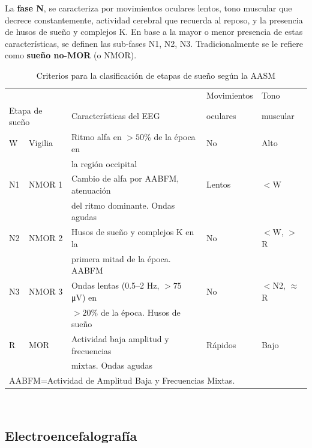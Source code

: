 \documentclass[12pt,letterpaper,draft]{book}
\newcommand{\hz}{\si{\hertz}\xspace}
\newcommand{\mv}{\si{\micro\volt}\xspace}
\begin{document}
%
La \textbf{fase N}, se caracteriza por movimientos oculares lentos, tono muscular que decrece 
constantemente, actividad cerebral que recuerda al reposo, y la presencia de husos de sueño y 
complejos K. 
%
En base a la mayor o menor presencia de estas características, se definen las sub-fases N1, N2, N3.
%
Tradicionalmente se le refiere como \textbf{sueño no-MOR} (o NMOR).

\begin{table}
\caption[Criterios para la clasificación de etapas de sueño]
{Criterios para la clasificación de etapas de sueño según la AASM}
\centering
{\small
\begin{tabular}{lllll}
\toprule
&&   & Movimientos & Tono \\
\multicolumn{2}{l}{Etapa de sueño}& Características del EEG & oculares & muscular \\
\midrule
 W  & Vigilia & {Ritmo alfa} en $>50$\% de la época en   & No & Alto \\
    &         & la región occipital                &    &      \\
 N1 & NMOR 1  & Cambio de alfa por AABFM, atenuación & Lentos & $<$W     \\
    &         & del ritmo dominante. Ondas agudas   &    &      \\
 N2 & NMOR 2  & Husos de sueño y complejos K en la    & No & $<$W, $>$R     \\
    &         & primera mitad de la época. AABFM &    &     \\
 N3 & NMOR 3  & {Ondas lentas} (0.5--2 \hz, $>75$ \mv) en& No & $<$N2, $\approx$R \\
    &         & $>20$\% de la época. Husos de sueño       &&      \\
 R  & MOR     & Actividad baja amplitud y frecuencias & Rápidos & Bajo  \\
    &         & mixtas. Ondas agudas             &       &       \\
\bottomrule
\multicolumn{4}{l}{AABFM=Actividad de Amplitud Baja y Frecuencias Mixtas.}
\end{tabular}\\
}
\label{cuadro:aasm}
\end{table}


\subsection{Electroencefalografía}
\label{sec:eeg}
\end{document}
